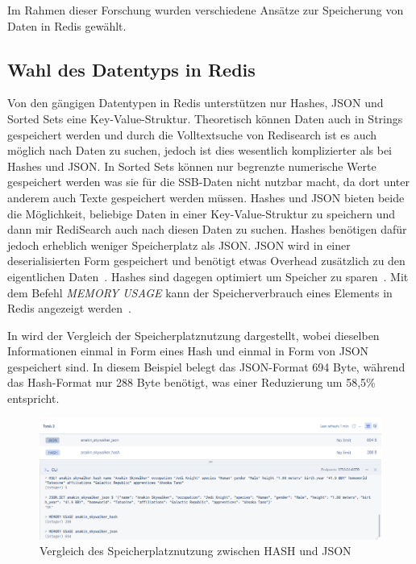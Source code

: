 Im Rahmen dieser Forschung wurden verschiedene Ansätze zur Speicherung von Daten in Redis gewählt.

\subsection{Wahl des Datentyps in Redis}
Von den gängigen Datentypen in Redis unterstützen nur Hashes, JSON und Sorted Sets eine Key-Value-Struktur. Theoretisch können Daten auch in Strings gespeichert werden und durch die Volltextsuche von Redisearch ist es auch möglich nach Daten zu suchen, jedoch ist dies wesentlich komplizierter als bei Hashes und JSON.
In Sorted Sets können nur begrenzte numerische Werte gespeichert werden was sie für die SSB-Daten nicht nutzbar macht, da dort unter anderem auch Texte gespeichert werden müssen.
Hashes und JSON bieten beide die Möglichkeit, beliebige Daten in einer Key-Value-Struktur zu speichern und dann mir RediSearch auch nach diesen Daten zu suchen.
Hashes benötigen dafür jedoch erheblich weniger Speicherplatz als JSON.
JSON wird in einer deserialisierten Form gespeichert und benötigt etwas Overhead zusätzlich zu den eigentlichen Daten~\cite{redis_json-ram-usage_nodate}.
Hashes sind dagegen optimiert um Speicher zu sparen~\cite{redis_memory-optimization_nodate}.
Mit dem Befehl \emph{MEMORY USAGE} kann der Speicherverbrauch eines Elements in Redis angezeigt werden~\cite{redis_memory-usage-command-redis_nodate}.

In  wird der Vergleich der Speicherplatznutzung dargestellt, wobei dieselben Informationen einmal in Form eines Hash und einmal in Form von JSON gespeichert sind. In diesem Beispiel belegt das JSON-Format 694 Byte, während das Hash-Format nur 288 Byte benötigt, was einer Reduzierung um 58,5\% entspricht.
\begin{figure}[!h]  %
    \centering
    \includegraphics[width=1\textwidth]{pictures/redis/redis_hash_vs_json_memory.png}
    \caption{Vergleich des Speicherplatznutzung zwischen HASH und JSON}
    \label{pic:redis-hash-vs-json-memory}
\end{figure}


